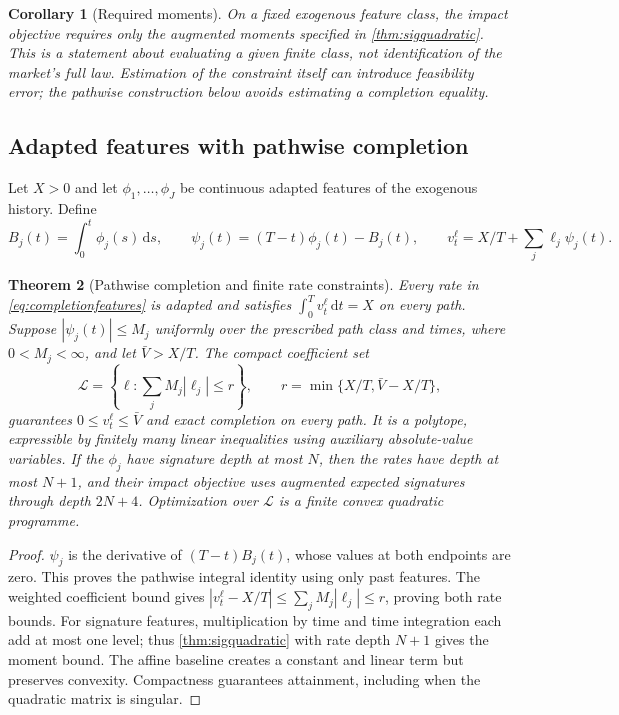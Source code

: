 \documentclass[11pt]{article}
\numberwithin{equation}{section}
\newtheorem{theorem}{Theorem}[section]
\newtheorem{corollary}[theorem]{Corollary}
\theoremstyle{definition}
\theoremstyle{remark}
\theoremstyle{definition}
\newcommand{\dd}{\,\mathrm d}
\begin{document}
\begin{corollary}[Required moments]\label{cor:sigestimation}
On a fixed exogenous feature class, the impact objective requires only the
augmented moments specified in \cref{thm:sigquadratic}. This is a statement
about evaluating a given finite class, not identification of the market's full
law. Estimation of the constraint itself can introduce feasibility error; the
pathwise construction below avoids estimating a completion equality.
\end{corollary}

\subsection{Adapted features with pathwise completion}
Let $X>0$ and let $\phi_1,\ldots,\phi_J$ be continuous adapted features
of the exogenous history. Define
\begin{equation}\label{eq:completionfeatures}
 B_j(t)=\int_0^t\phi_j(s)\dd s,\qquad
 \psi_j(t)=(T-t)\phi_j(t)-B_j(t),\qquad
 v_t^\ell=X/T+\sum_j\ell_j\psi_j(t).
\end{equation}

\begin{theorem}[Pathwise completion and finite rate constraints]\label{thm:completion}
Every rate in \eqref{eq:completionfeatures} is adapted and satisfies
$\int_0^Tv_t^\ell\dd t=X$ on every path. Suppose
$|\psi_j(t)|\le M_j$ uniformly over the prescribed path class and times,
where $0<M_j<\infty$, and let $\bar V>X/T$. The compact coefficient set
\begin{equation}\label{eq:completionpolytope}
 \mathcal L=\left\{\ell:\sum_jM_j|\ell_j|\le r\right\},\qquad
 r=\min\{X/T,\bar V-X/T\},
\end{equation}
guarantees $0\le v_t^\ell\le\bar V$ and exact completion on every path.
It is a polytope, expressible by finitely many linear inequalities using
auxiliary absolute-value variables. If the $\phi_j$ have signature depth at
most $N$, then the rates have depth at most $N+1$, and their impact objective
uses augmented expected signatures through depth $2N+4$. Optimization over
$\mathcal L$ is a finite convex quadratic programme.
\end{theorem}
\begin{proof}
$\psi_j$ is the derivative of $(T-t)B_j(t)$, whose values at both endpoints
are zero. This proves the pathwise integral identity using only past features.
The weighted coefficient bound gives
$|v_t^\ell-X/T|\le\sum_jM_j|\ell_j|\le r$, proving both rate bounds.
For signature features, multiplication by time and time integration each add
at most one level; thus \cref{thm:sigquadratic} with rate depth $N+1$
gives the moment bound. The affine baseline creates a constant and linear
term but preserves convexity. Compactness guarantees attainment, including
when the quadratic matrix is singular.
\end{proof}
\end{document}
